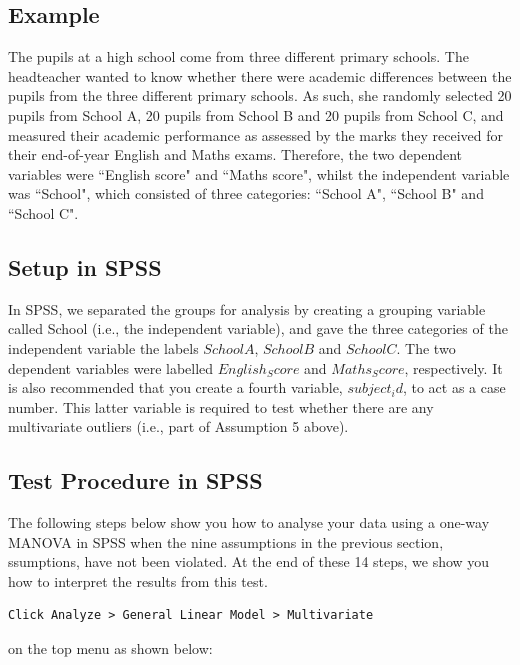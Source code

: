 \documentclass[12pt]{article} %
\begin{document}
\subsection{Example}
The pupils at a high school come from three different primary schools. The headteacher wanted to know whether there were academic differences between the pupils from the three different primary schools. As such, she randomly selected 20 pupils from School A, 20 pupils from School B and 20 pupils from School C, and measured their academic performance as assessed by the marks they received for their end-of-year English and Maths exams. Therefore, the two dependent variables were ``English score" and ``Maths score", whilst the independent variable was ``School", which consisted of three categories: ``School A", ``School B" and ``School C".


\subsection{Setup in SPSS}
In SPSS, we separated the groups for analysis by creating a grouping variable called School (i.e., the independent variable), and gave the three categories of the independent variable the labels $School A$, $School B$ and $School C$. The two dependent variables were labelled $English_Score$ and $Maths_Score$, respectively. It is also recommended that you create a fourth variable, $subject_id$, to act as a case number. This latter variable is required to test whether there are any multivariate outliers (i.e., part of Assumption 5 above).




\subsection{Test Procedure in SPSS}
The following steps below show you how to analyse your data using a one-way MANOVA in SPSS when the nine assumptions in the previous section, ssumptions, have not been violated. At the end of these 14 steps, we show you how to interpret the results from this test.
\begin{verbatim}
Click Analyze > General Linear Model > Multivariate
\end{verbatim}
on the top menu as shown below:
\end{document}

